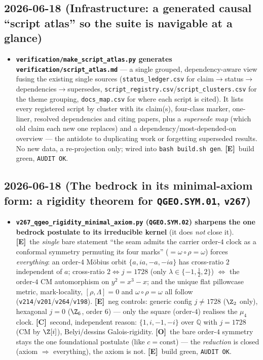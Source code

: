 \documentclass[11pt]{article}
\providecommand{\mE}{\textbf{[E]}}\providecommand{\mC}{\textbf{[C]}}
\providecommand{\mO}{\textbf{[O]}}\providecommand{\mX}{\textbf{[X]}}
\providecommand{\vref}[1]{\texttt{#1}}
\begin{document}
\subsection*{2026-06-18 (Infrastructure: a generated causal ``script atlas'' so the suite is navigable at a glance)}
\begin{itemize}
\item \textbf{\texttt{verification/make\_script\_atlas.py} generates \texttt{verification/script\_atlas.md}} ---
  a single grouped, dependency-aware view fusing the existing single sources (\texttt{status\_ledger.csv} for
  claim$\to$status$\to$dependencies$\to$supersedes, \texttt{script\_registry.csv}/\texttt{script\_clusters.csv}
  for the theme grouping, \texttt{docs\_map.csv} for where each script is cited). It lists every registered
  script by cluster with its claim(s), four-class marker, one-liner, resolved dependencies and citing papers,
  plus a \emph{supersede map} (which old claim each new one replaces) and a dependency/most-depended-on
  overview --- the antidote to duplicating work or forgetting superseded results. No new data, a re-projection
  only; wired into \texttt{bash build.sh gen}. \mE\ build green, \texttt{AUDIT OK}.
\end{itemize}

\subsection*{2026-06-18 (The bedrock in its minimal-axiom form: a rigidity theorem for \texttt{QGEO.SYM.01}, \texttt{v267})}
\begin{itemize}
\item \textbf{\texttt{v267\_qgeo\_rigidity\_minimal\_axiom.py} (\texttt{QGEO.SYM.02}) sharpens the one bedrock
  postulate to its irreducible kernel} (it does \emph{not} close it). \mE\ the \emph{single} bare statement
  ``the seam admits the carrier order-$4$ clock as a conformal symmetry permuting its four marks''
  ($=\omega\circ\rho=\omega$) forces \emph{everything}: an order-$4$ M\"obius orbit $\{a,ia,-a,-ia\}$ has
  cross-ratio $2$ independent of $a$; cross-ratio $2\Leftrightarrow j{=}1728$ (only $\lambda\in\{-1,\tfrac12,2\}$)
  $\Leftrightarrow$ the order-$4$ CM automorphism on $y^2{=}x^3{-}x$; and the unique flat pillowcase metric,
  mark-locality, $[\rho,\Lambda]{=}0$ and $\omega\circ\rho{=}\omega$ all follow (\vref{v214}/\vref{v201}/\vref{v264}/\vref{v198}).
  \mE\ neg controls: generic config $j\neq1728$ ($\Z_2$ only), hexagonal $j{=}0$ ($\Z_6$, order $6$) --- only
  the square (order-$4$) realises the $\mu_4$ clock. \mC\ second, independent reason: $\{1,i,-1,-i\}$ over
  $\mathbb Q$ with $j{=}1728$ (CM by $\Z[i]$), Belyi/dessins Galois-rigidity. \mO\ the bare order-$4$ symmetry stays
  the one foundational postulate (like $c{=}$const) --- the \emph{reduction} is closed (axiom $\Rightarrow$
  everything), the axiom is not. \mE\ build green, \texttt{AUDIT OK}.
\end{itemize}
\end{document}
